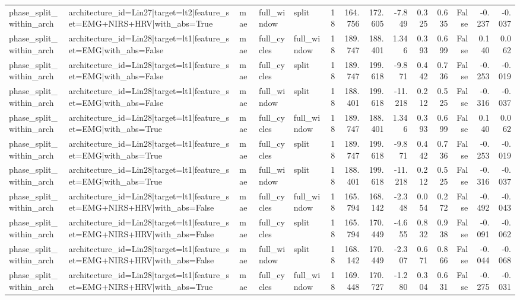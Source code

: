\begin{table}
\begin{tabular}{lllllrrrrrrrrr}
phase_split_within_arch & architecture_id=Lin27|target=lt2|feature_set=EMG+NIRS+HRV|with_abs=True & mae & full_window & split & 18 & 164.756 & 172.605 & -7.849 & 0.325 & 0.635 & False & -0.237 & -0.037 \\
phase_split_within_arch & architecture_id=Lin28|target=lt1|feature_set=EMG|with_abs=False & mae & full_cycles & full_window & 18 & 189.747 & 188.401 & 1.346 & 0.393 & 0.699 & False & 0.140 & 0.062 \\
phase_split_within_arch & architecture_id=Lin28|target=lt1|feature_set=EMG|with_abs=False & mae & full_cycles & split & 18 & 189.747 & 199.618 & -9.871 & 0.442 & 0.736 & False & -0.253 & -0.019 \\
phase_split_within_arch & architecture_id=Lin28|target=lt1|feature_set=EMG|with_abs=False & mae & full_window & split & 18 & 188.401 & 199.618 & -11.218 & 0.212 & 0.525 & False & -0.316 & -0.037 \\
phase_split_within_arch & architecture_id=Lin28|target=lt1|feature_set=EMG|with_abs=True & mae & full_cycles & full_window & 18 & 189.747 & 188.401 & 1.346 & 0.393 & 0.699 & False & 0.140 & 0.062 \\
phase_split_within_arch & architecture_id=Lin28|target=lt1|feature_set=EMG|with_abs=True & mae & full_cycles & split & 18 & 189.747 & 199.618 & -9.871 & 0.442 & 0.736 & False & -0.253 & -0.019 \\
phase_split_within_arch & architecture_id=Lin28|target=lt1|feature_set=EMG|with_abs=True & mae & full_window & split & 18 & 188.401 & 199.618 & -11.218 & 0.212 & 0.525 & False & -0.316 & -0.037 \\
phase_split_within_arch & architecture_id=Lin28|target=lt1|feature_set=EMG+NIRS+HRV|with_abs=False & mae & full_cycles & full_window & 18 & 165.794 & 168.142 & -2.348 & 0.054 & 0.272 & False & -0.492 & -0.043 \\
phase_split_within_arch & architecture_id=Lin28|target=lt1|feature_set=EMG+NIRS+HRV|with_abs=False & mae & full_cycles & split & 18 & 165.794 & 170.449 & -4.655 & 0.832 & 0.938 & False & -0.091 & -0.062 \\
phase_split_within_arch & architecture_id=Lin28|target=lt1|feature_set=EMG+NIRS+HRV|with_abs=False & mae & full_window & split & 18 & 168.142 & 170.449 & -2.307 & 0.671 & 0.866 & False & -0.044 & -0.068 \\
phase_split_within_arch & architecture_id=Lin28|target=lt1|feature_set=EMG+NIRS+HRV|with_abs=True & mae & full_cycles & full_window & 18 & 169.448 & 170.727 & -1.280 & 0.304 & 0.631 & False & -0.275 & -0.031 \\

\end{tabular}
\end{table}
